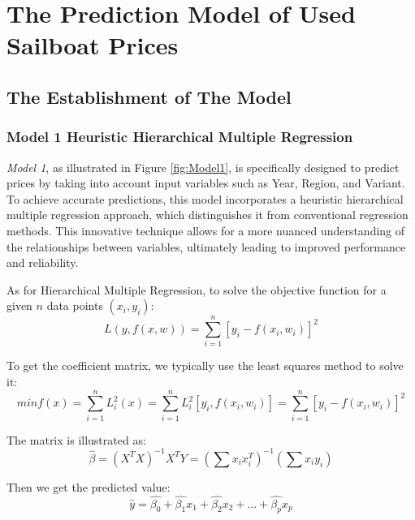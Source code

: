 \documentclass[12pt]{article}  %
\begin{document}
\section{The Prediction Model of Used Sailboat Prices}

\subsection{The Establishment of The Model}
\subsubsection{Model 1 \textemdash  Heuristic Hierarchical Multiple Regression}

\emph{Model 1}, as illustrated in Figure \ref{fig:Model1}, is specifically designed to predict prices by taking into account input variables such as Year, Region, and Variant. To achieve accurate predictions, this model incorporates a heuristic hierarchical multiple regression approach, which distinguishes it from conventional regression methods. This innovative technique allows for a more nuanced understanding of the relationships between variables, ultimately leading to improved performance and reliability.

As for Hierarchical Multiple Regression, to solve the objective function for a given $n$ data points $(x_i, y_i)$:
$$L(y,f(x,w))=\sum_{i=1}^{n}[y_i-f(x_i,w_i)]^2$$

To get the coefficient matrix, we typically use the least squares method to solve it:
$$minf(x)=\sum_{i=1}^{n}L^2_i(x)=\sum_{i=1}^{n}L_i^2[y_i,f(x_i,w_i)]=\sum_{i=1}^{n}[y_i-f(x_i,w_i)]^2$$

The matrix is illustrated as:
$$\hat{\beta}=(X^TX)^{-1}X^TY=(\sum x_ix_i^T)^{-1}(\sum x_iy_i)$$

Then we get the predicted value:
$$\hat{y} = \hat{\beta_0} + \hat{\beta_1} x_1 + \hat{\beta_2} x_2 + ... + \hat{\beta_p} x_p$$
\end{document}
